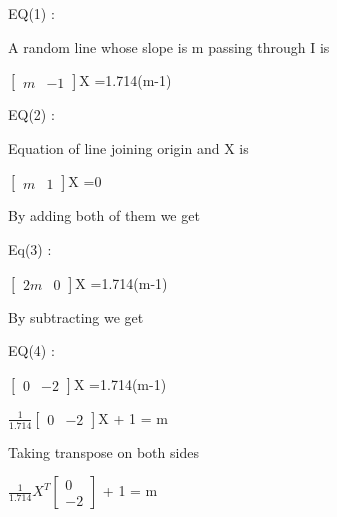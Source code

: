 \documentclass{beamer}
\begin{document}
\begin{frame}
EQ(1) :


A random line  whose slope is m passing through I is


 $\begin{bmatrix}
 m &-1 
\end{bmatrix}$X =1.714(m-1)  

  
EQ(2) :


Equation of line joining origin and X is

$\begin{bmatrix}
 m &1 
\end{bmatrix}$X =0    

By adding both of them we get 

Eq(3) :

$\begin{bmatrix}
 2m & 0 
\end{bmatrix}$X =1.714(m-1) 

By subtracting we get 

EQ(4) :

$\begin{bmatrix}
 0 & -2 
\end{bmatrix}$X =1.714(m-1) 

$\frac{1}{1.714}
\begin{bmatrix}
 0 & -2 
\end{bmatrix}$X  + 1 = m

Taking transpose on both sides 

$\frac{1}{1.714}X^{T}
\begin{bmatrix}
 0 \\ 
 -2 
\end{bmatrix}$  + 1 = m

\end{frame}
\end{document}
